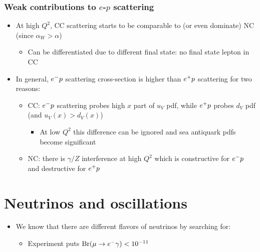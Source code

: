 \subsubsection{Weak contributions to $e$-$p$ scattering}
\begin{itemize}
  \item At high $Q^2$, CC scattering starts to be comparable to (or even dominate) NC (since $\alpha_W > \alpha$)
  \begin{itemize}
    \item Can be differentiated due to different final state: no final state lepton in CC
  \end{itemize}
  \item In general, $e^{-} p$ scattering cross-section is higher than $e^{+} p$ scattering for two reasons:
  \begin{itemize}
    \item CC: $e^{-} p$ scattering probes high $x$ part of $u_V$ pdf, while $e^{+} p$ probes $d_V$ pdf (and $u_V(x) > d_V(x)$)
    \begin{itemize}
      \item At low $Q^2$ this difference can be ignored and sea antiquark pdfs become significant
    \end{itemize}
    \item NC: there is $\gamma/Z$ interference at high $Q^2$ which is constructive for $e^{-} p$ and destructive for $e^{+} p$
  \end{itemize}
\end{itemize}

\section{Neutrinos and oscillations}
\begin{itemize}
  \item We know that there are different flavors of neutrinos by searching for:
  \begin{itemize}
    \item Experiment puts $\text{Br}(\mu\rightarrow e^{-}\gamma)<10^{-11}$
  \end{itemize}
\end{itemize}

